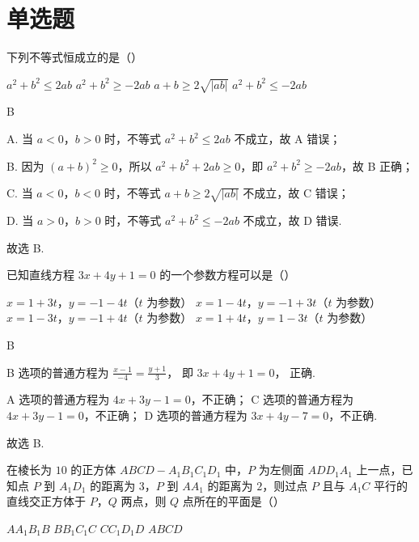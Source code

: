 \section{单选题}

\begin{problem}
下列不等式恒成立的是（\quad）

\choices
    {\(a^2+b^2\le2ab\)}
    {\(a^2+b^2\ge-2ab\)}
    {\(a+b\ge2\sqrt{|ab|}\)}
    {\(a^2+b^2\le-2ab\)}
\end{problem}

\begin{answer}
B
\end{answer}

\begin{solution}
A. 当 \(a<0\)，\(b>0\) 时，不等式 \(a^2+b^2\le2ab\) 不成立，故 A 错误；

B. 因为 \((a+b)^2\ge0\)，所以 \(a^2+b^2+2ab\ge0\)，即 \(a^2+b^2\ge-2ab\)，故 B 正确；

C. 当 \(a<0\)，\(b<0\) 时，不等式 \(a+b\ge2\sqrt{|ab|}\) 不成立，故 C 错误；

D. 当 \(a>0\)，\(b>0\) 时，不等式 \(a^2+b^2\le-2ab\) 不成立，故 D 错误.

故选 B.
\end{solution}

\begin{problem}
已知直线方程 \(3x+4y+1=0\) 的一个参数方程可以是（\quad）

\choices
    {\(x=1+3t\)，\(y=-1-4t\)（\(t\) 为参数）}
    {\(x=1-4t\)，\(y=-1+3t\)（\(t\) 为参数）}
    {\(x=1-3t\)，\(y=-1+4t\)（\(t\) 为参数）}
    {\(x=1+4t\)，\(y=1-3t\)（\(t\) 为参数）}
\end{problem}

\begin{answer}
B
\end{answer}

\begin{solution}
B 选项的普通方程为
\(\frac{x-1}{-4}=\frac{y+1}{3}\)，
即
\(3x+4y+1=0\)，
正确.

A 选项的普通方程为 \(4x+3y-1=0\)，不正确；
C 选项的普通方程为 \(4x+3y-1=0\)，不正确；
D 选项的普通方程为 \(3x+4y-7=0\)，不正确.

故选 B.
\end{solution}

\begin{problem}
在棱长为 \(10\) 的正方体 \(ABCD-A_1B_1C_1D_1\) 中，\(P\) 为左侧面 \(ADD_1A_1\) 上一点，已知点 \(P\) 到 \(A_1D_1\) 的距离为 \(3\)，\(P\) 到 \(AA_1\) 的距离为 \(2\)，则过点 \(P\) 且与 \(A_1C\) 平行的直线交正方体于 \(P\)，\(Q\) 两点，则 \(Q\) 点所在的平面是（\quad）


\choices
    {\(AA_1B_1B\)}
    {\(BB_1C_1C\)}
    {\(CC_1D_1D\)}
    {\(ABCD\)}
\end{problem}

